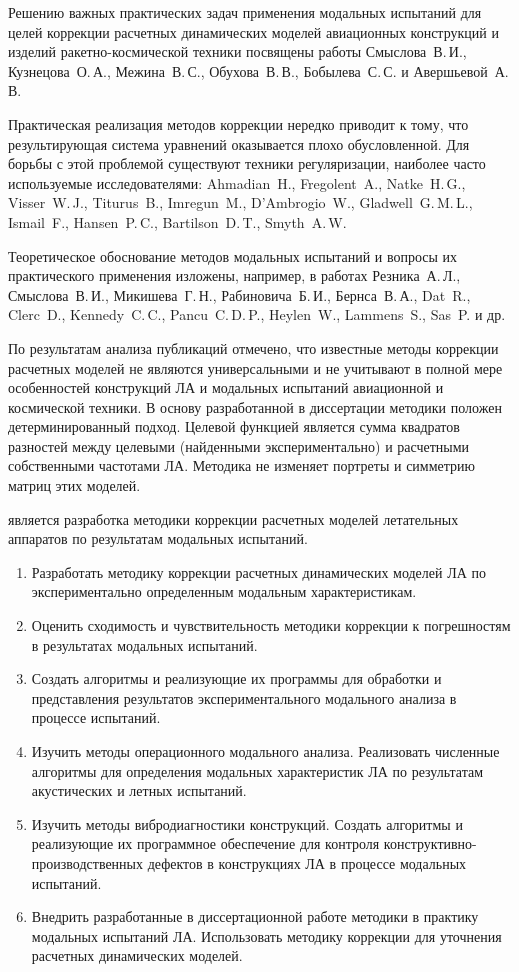 Решению важных практических задач применения модальных испытаний для целей коррекции расчетных динамических моделей авиационных конструкций и изделий ракетно-космической техники посвящены работы Смыслова~В.\,И., Кузнецова~О.\,А., Межина~В.\,С., Обухова~В.\,В., Бобылева~С.\,С. и Авершьевой~А.\,В. 

Практическая реализация методов коррекции нередко приводит к тому, что результирующая система уравнений оказывается плохо обусловленной. Для борьбы с этой проблемой существуют техники регуляризации, наиболее часто используемые исследователями: Ahmadian~H., Fregolent~A., Natke~H.\,G., Visser~W.\,J., Titurus~B., Imregun~M., D'Ambrogio~W., Gladwell~G.\,M.\,L., Ismail~F., Hansen~P.\,C., Bartilson~D.\,T., Smyth~A.\,W.

Теоретическое обоснование методов модальных испытаний и вопросы их практического применения изложены, например, в работах Резника~А.\,Л., Смыслова~В.\,И., Микишева~Г.\,Н., Рабиновича~Б.\,И., Бернса~В.\,А., Dat~R., Clerc~D., Kennedy~C.\,C., Pancu~C.\,D.\,P., Heylen~W., Lammens~S., Sas~P. и др.

По результатам анализа публикаций отмечено, что известные методы коррекции расчетных моделей не являются универсальными и не учитывают в полной мере особенностей конструкций ЛА и модальных испытаний авиационной и космической техники. В основу разработанной в диссертации методики положен детерминированный подход. Целевой функцией является сумма квадратов разностей между целевыми (найденными экспериментально) и расчетными собственными частотами ЛА. Методика не изменяет портреты и симметрию матриц этих моделей.

{\aim} является разработка методики коррекции расчетных моделей летательных аппаратов по результатам модальных испытаний. 

{\tasks}
\begin{enumerate}[beginpenalty = 10000] 
	\item Разработать методику коррекции расчетных динамических моделей ЛА по экспериментально определенным модальным характеристикам.
	\item Оценить сходимость и чувствительность методики коррекции к погрешностям в результатах модальных испытаний.
	\item Создать алгоритмы и реализующие их программы для обработки и представления результатов экспериментального модального анализа в процессе испытаний.
	\item Изучить методы операционного модального анализа. Реализовать численные алгоритмы для определения модальных характеристик ЛА по результатам акустических и летных испытаний.
	\item Изучить методы вибродиагностики конструкций. Создать алгоритмы и реализующие их программное обеспечение для контроля конструктивно-производственных дефектов в конструкциях ЛА в процессе модальных испытаний.
	\item Внедрить разработанные в диссертационной работе методики в практику  модальных испытаний ЛА. Использовать методику коррекции для уточнения расчетных динамических моделей.
\end{enumerate}

